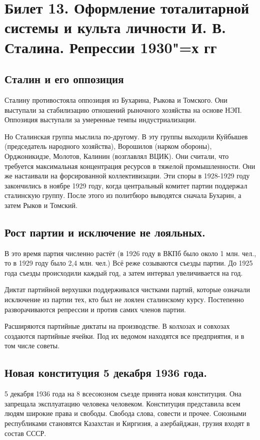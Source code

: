 \section{Билет 13. Оформление тоталитарной системы и культа личности И. В. Сталина. Репрессии 1930"=х гг}

\subsection{Сталин и его оппозиция}

Сталину противостояла оппозиция из Бухарина, Рыкова и Томского. Они выступали за стабилизацию отношений рыночного хозяйства на основе НЭП. Оппозиция выступали за умеренные темпы индустриализации.

Но Сталинская группа мыслила по-другому. В эту группы выходили Куйбышев (председатель народного хозяйства), Ворошилов (нарком обороны), Орджоникидзе, Молотов, Калинин (возглавлял ВЦИК). Они считали, что требуется максимальная концентрация ресурсов в тяжелой промышленности. Они же настаивали на форсированной коллективизации. Эти споры в 1928-1929 году закончились в ноябре 1929 году, когда центральный комитет партии поддержал сталинскую группу. После этого из политбюро выводятся сначала Бухарин, а затем Рыков и Томский.

\subsection{Рост партии и исключение не лояльных.}

В это время партия численно растёт (в 1926 году в ВКПб было около 1 млн. чел., то в 1929 году было 2,4 млн. чел.) Всё реже созываются съезды партии. До 1925 года съезды происходили каждый год, а затем интервал увеличивается на год. 

Диктат партийной верхушки поддерживался чистками партий, которые означали исключение из партии тех, кто был не лоялен сталинскому курсу. Постепенно разворачиваются репрессии и против самих членов партии.

Расширяются партийные диктаты на производстве. В колхозах и совхозах создаются партийные ячейки. Под их ведомом находятся все предприятия, и в том числе советы.

\subsection{Новая конституция 5 декабря 1936 года.}

5 декабря 1936 года на 8 всесоюзном съезде принята новая конституция. Она запрещала эксплуатацию человека человеком. Конституция представила всем людям широкие права и свободы. Свобода слова, совести и прочее. Союзными республиками становятся Казахстан и Киргизия, а азербайджан, грузия входят в состав СССР.

